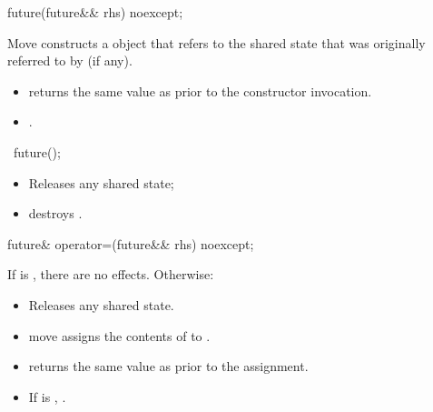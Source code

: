 %
\begin{itemdecl}
future(future&& rhs) noexcept;
\end{itemdecl}

\begin{itemdescr}
\pnum
\effects
Move constructs a  object that refers to the shared
state that
was originally referred to by  (if any).

\pnum
\ensures
\begin{itemize}
\item {} returns the same value as  prior to the
constructor invocation.
\item {}.
\end{itemize}
\end{itemdescr}

%
\begin{itemdecl}
~future();
\end{itemdecl}

\begin{itemdescr}
\pnum
\effects
\begin{itemize}
\item
Releases any shared state;
\item
destroys .
\end{itemize}
\end{itemdescr}

%
\begin{itemdecl}
future& operator=(future&& rhs) noexcept;
\end{itemdecl}

\begin{itemdescr}
\pnum
\effects
If  is , there are no effects.
Otherwise:
\begin{itemize}
\item
Releases any shared state.
\item
move assigns the contents of  to .
\end{itemize}

\pnum
\ensures
\begin{itemize}
\item
{} returns the same value as  prior to the
assignment.

\item
If  is ,
.
\end{itemize}
\end{itemdescr}

